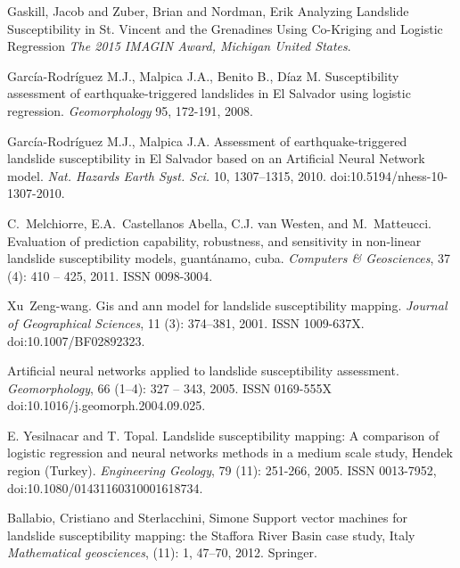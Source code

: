 \documentclass[11pt,twoside]{rmta2010eng}%
\begin{document}
\begin{thebibliography}{99}
Gaskill, Jacob and Zuber, Brian and Nordman, Erik
\newblock Analyzing Landslide Susceptibility in St. Vincent and the Grenadines Using Co-Kriging and Logistic Regression
\newblock \emph{The 2015 IMAGIN Award, Michigan United States}.

  
Garc\'{i}a-Rodr\'{i}guez M.J., Malpica J.A., Benito B., D\'{i}az M.
\newblock  Susceptibility assessment of earthquake-triggered landslides in El Salvador using logistic regression.
\newblock \emph{Geomorphology}
 95, 172-191, 2008. 
  


Garc\'{i}a-Rodr\'{i}guez M.J., Malpica J.A.
\newblock Assessment of earthquake-triggered landslide susceptibility in El Salvador based on an Artificial Neural Network model.
\newblock \emph{Nat. Hazards Earth Syst. Sci.}
 10, 1307–1315, 2010. 
\newblock doi:10.5194/nhess-10-1307-2010.
  

C.~Melchiorre, E.A.~Castellanos Abella, C.J. van Westen, and M.~Matteucci.
\newblock Evaluation of prediction capability, robustness, and sensitivity in
  non-linear landslide susceptibility models, guant\'{a}namo, cuba.
\newblock \emph{Computers {\&} Geosciences}, 37 (4): 410 --
  425, 2011.
\newblock ISSN 0098-3004.


Xu~Zeng-wang.
\newblock Gis and ann model for landslide susceptibility mapping.
\newblock \emph{Journal of Geographical Sciences}, 11 (3):
  374--381, 2001.
\newblock ISSN 1009-637X.
\newblock doi:{10.1007/BF02892323}.


Artificial neural networks applied to landslide susceptibility assessment.
\newblock \emph{Geomorphology}, 66 (1–4): 327 -- 343, 2005.
\newblock ISSN 0169-555X
\newblock doi:10.1016/j.geomorph.2004.09.025.



E. Yesilnacar and T. Topal.
\newblock Landslide susceptibility mapping: A comparison of logistic regression and neural networks methods in a medium scale study, Hendek region (Turkey).
\newblock \emph{Engineering Geology}, 79
  (11): 251-266, 2005.
\newblock ISSN 0013-7952,
\newblock doi:10.1080/01431160310001618734.




Ballabio, Cristiano and Sterlacchini, Simone
\newblock Support vector machines for landslide susceptibility mapping: the Staffora River Basin case study, Italy
\newblock \emph{Mathematical geosciences},
  (11): 1, 47--70, 2012.
\newblock Springer. 




\end{thebibliography}
\end{document}
